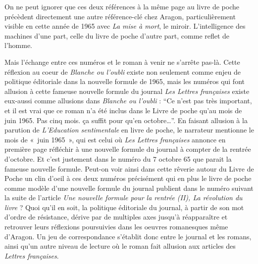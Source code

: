 	  On ne peut ignorer que ces deux références à la même page au livre de poche précèdent directement une autre référence-clé chez Aragon, particulièrement visible en cette année de 1965 avec \emph{La mise à mort}, le miroir. L’intelligence des machines d’une part, celle du livre de poche d’autre part, comme reflet de l’homme. 


Mais l’échange entre ces numéros et le roman à venir ne s’arrête pas-là. Cette réflexion au coeur de \emph{Blanche ou l’oubli} existe non seulement comme enjeu de politique éditoriale dans la nouvelle formule de 1965, mais les numéros qui font allusion à cette fameuse nouvelle formule du journal \emph{Les Lettres françaises} existe eux-aussi comme allusions dans \emph{Blanche ou l’oubli} : \enquote{Ce n’est pas très important, et il est vrai que ce roman n’a été inclus dans le Livre de poche qu’au mois de juin 1965. Pas cinq mois. ça suffit pour qu’en octobre…}. En faisant allusion à la parution de \emph{L’Education sentimentale} en livre de poche, le narrateur mentionne le mois de « juin 1965 », qui est celui où \emph{Les Lettres françaises} annonce en première page réfléchir à une nouvelle formule du journal à compter de la rentrée d’octobre. Et c’est justement dans le numéro du 7 octobre 65 que parait la fameuse nouvelle formule. Peut-on voir ainsi dans cette rêverie autour du Livre de Poche un clin d’oeil à ces deux numéros précisément qui en plus le livre de poche comme modèle d’une nouvelle formule du journal publient dans le numéro suivant la suite de l’article \emph{Une nouvelle formule pour la rentrée (II), La révolution du livre }? Quoi qu’il en soit, la politique éditoriale du journal, à partir de son mot d’ordre de résistance, dérive par de multiples axes jusqu’à réapparaître et retrouver leurs réflexions poursuivies dans les oeuvres romanesques même d’Aragon. Un jeu de correspondance s’établit donc entre le journal et les romans, ainsi qu’un autre niveau de lecture où le roman fait allusion aux articles des \emph{Lettres françaises}. 



